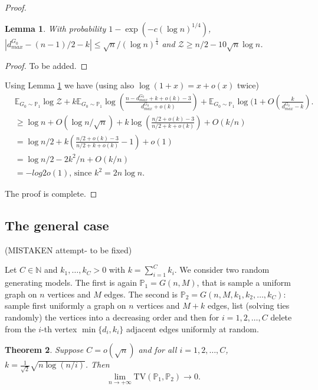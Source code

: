 \documentclass[12pt,a4paper]{article}
\newtheorem{theorem}{Theorem}[section]
\numberwithin{equation}{section}
\newtheorem{lemma}[theorem]{Lemma}
\numberwithin{equation}{section}
\newcommand{\1}{{\text{\Large $\mathfrak 1$}}}
\newcommand{\2}[1]{{\text{\Large $\mathfrak 1$}\!\left(#1\right)}}
\begin{document}
\begin{proof}
\begin{lemma}\label{lem}
With probability $1-\exp(-c(\log n)^{1/4})$, $|d^{G_0}_{max}-(n-1)/2-k| \leq \sqrt{n}/(\log n)^{\frac{1}{4}}$ and $ \mathcal{Z} \geq n/2-10 \sqrt{n} \log n$.
\end{lemma}


\begin{proof}
To be added. 
\end{proof}
Using Lemma \ref{lem} we have (using also $\log (1+x)=x+o(x)$ twice)
\begin{align*}
&\mathbb{E}_{G_0 \sim \mathbb{P}_1} \log \mathcal{Z}+k\mathbb{E}_{G_0 \sim \mathbb{P}_1}\log \left(\frac{n-d^{G_0}_{max}+k+o(k)-3}{d^{G_0}_{max}+o(k)}\right)+\mathbb{E}_{G_0 \sim \mathbb{P}_1}\log (1+O(\frac{k}{d^{G_0}_{max}-k}).\\
& \geq \log n+O(\log n/\sqrt{n})+k\log \left(\frac{n/2+o(k)-3}{n/2+k+o(k)}\right)+O(k/n)\\
&= \log n/2+k\left(\frac{n/2+o(k)-3}{n/2+k+o(k)}-1\right)+o(1)\\
&=\log n/2-2k^2/n+O(k/n) \\
&=-log 2o(1)\text{, since } k^2=2n\log n.
\end{align*}

The proof is complete.
\end{proof}


\subsection{The general case}
(MISTAKEN attempt- to be fixed)

Let $C \in \mathbb{N}$ and $k_1,\ldots,k_C>0$ with $k=\sum_{i=1}^C k_i$.
We consider two random generating models. The first is again $\mathbb{P}_1=G(n,M)$, that is sample a uniform graph on $n$ vertices and $M$ edges. The second is $\mathbb{P}_2=G(n,M,k_1,k_2,\ldots,k_C)$: sample first uniformly a graph on $n$ vertices and $M+k$ edges, list (solving ties randomly) the vertices into a decreasing order and then for $i=1,2,\ldots,C$ delete from the $i$-th vertex $\min\{ d_i,k_i\}$ adjacent edges uniformly at random. 


\begin{theorem}
Suppose $C=o(\sqrt{n})$ and for all $i=1,2,\ldots,C$, $k=\frac{1}{\sqrt{2}}\sqrt{n \log (n/i)}$. Then $$ \lim_{n \rightarrow +\infty} \mathrm{TV}\left(\mathbb{P}_1,\mathbb{P}_2\right) \rightarrow 0.$$
\end{theorem}
\end{document}
